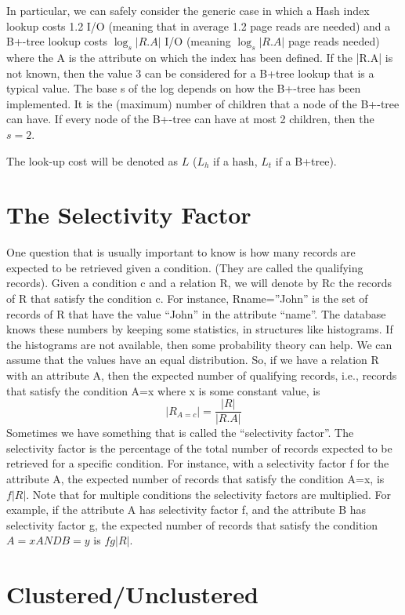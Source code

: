 \documentclass[11pt]{article}
\begin{document}
In particular, we can safely consider the generic case in which a Hash index lookup costs 1.2 I/O (meaning that in average 1.2 page reads are needed) and a B+-tree lookup costs  $\log_s | R.A |$ I/O (meaning $\log_s | R.A |$ page reads needed) where the A is the attribute on which the index has been defined. If the |R.A| is not known, then the value 3 can be considered for a B+tree lookup that is a typical value. The base s of the log depends on how the B+-tree has been implemented. It is the (maximum) number of children that a node of the B+-tree can have. If every node of the B+-tree can have at most 2 children, then the $s=2$.

The look-up cost will be denoted as $L$ ($L_h$ if a hash, $L_t$ if a B+tree).

\section{The Selectivity Factor}

One question that is usually important to know is how many records are expected to be retrieved given a condition. (They are called the qualifying records). Given a condition c and a relation R, we will denote by Rc the records of R that satisfy the condition c. For instance, Rname=”John” is the set of records of R that have the value “John” in the attribute “name”. The database knows these numbers by keeping some statistics, in structures like histograms. If the histograms are not available, then some probability theory can help. We can assume that the values have an equal distribution. So, if we have a relation R with an attribute A, then the expected number of qualifying records, i.e., records that satisfy the condition A=x where x is some constant value, is
$$
|R_{A = c}| = \frac { |R| }{ |R.A| }
$$
Sometimes we have something that is called the “selectivity factor”. The selectivity factor is the percentage of the total number of records expected to be retrieved for a specific condition. For instance, with a selectivity factor f for the attribute A, the expected number of records that satisfy the condition A=x, is $f|R|$.
Note that for multiple conditions the selectivity factors are multiplied. For example, if the attribute A has selectivity factor f, and the attribute B has selectivity factor g, the expected number of records that satisfy the condition $A=x AND B=y$ is $fg|R|$.

\section{Clustered/Unclustered}
\end{document}
